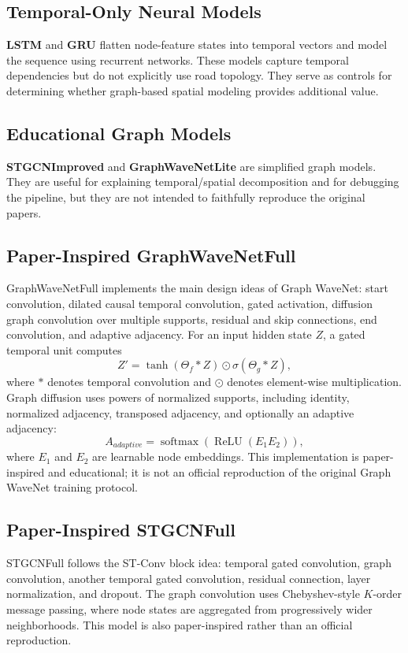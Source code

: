 \documentclass[11pt]{article}
\begin{document}
\subsection{Temporal-Only Neural Models}
\textbf{LSTM} and \textbf{GRU} flatten node-feature states into temporal vectors and model the sequence using recurrent networks. These models capture temporal dependencies but do not explicitly use road topology. They serve as controls for determining whether graph-based spatial modeling provides additional value.

\subsection{Educational Graph Models}
\textbf{STGCNImproved} and \textbf{GraphWaveNetLite} are simplified graph models. They are useful for explaining temporal/spatial decomposition and for debugging the pipeline, but they are not intended to faithfully reproduce the original papers.

\subsection{Paper-Inspired GraphWaveNetFull}
GraphWaveNetFull implements the main design ideas of Graph WaveNet: start convolution, dilated causal temporal convolution, gated activation, diffusion graph convolution over multiple supports, residual and skip connections, end convolution, and adaptive adjacency. For an input hidden state $Z$, a gated temporal unit computes
\begin{equation}
  Z' = \tanh(\Theta_f * Z) \odot \sigma(\Theta_g * Z),
\end{equation}
where $*$ denotes temporal convolution and $\odot$ denotes element-wise multiplication. Graph diffusion uses powers of normalized supports, including identity, normalized adjacency, transposed adjacency, and optionally an adaptive adjacency:
\begin{equation}
  A_{adaptive}=\operatorname{softmax}(\operatorname{ReLU}(E_1E_2)),
\end{equation}
where $E_1$ and $E_2$ are learnable node embeddings. This implementation is paper-inspired and educational; it is not an official reproduction of the original Graph WaveNet training protocol.

\subsection{Paper-Inspired STGCNFull}
STGCNFull follows the ST-Conv block idea: temporal gated convolution, graph convolution, another temporal gated convolution, residual connection, layer normalization, and dropout. The graph convolution uses Chebyshev-style $K$-order message passing, where node states are aggregated from progressively wider neighborhoods. This model is also paper-inspired rather than an official reproduction.
\end{document}
